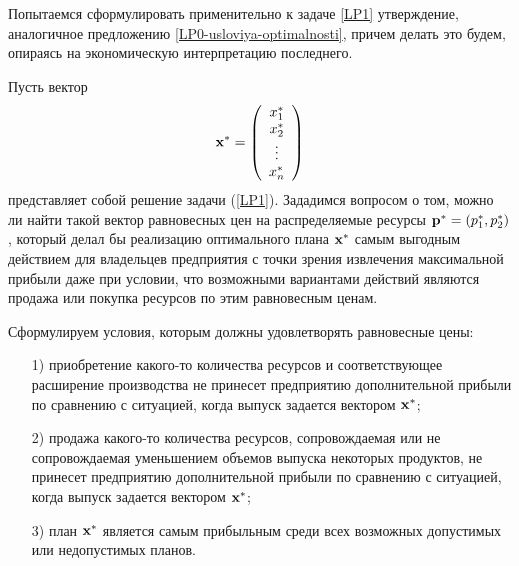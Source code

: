     Попытаемся сформулировать применительно к задаче \ref{LP1}
    утверждение, аналогичное предложению
    \ref{LP0-usloviya-optimalnosti}, причем делать это будем,
    опираясь на экономическую интерпретацию последнего.

    Пусть вектор
    \[\mathbf{x^{*}}=\left(
     \begin{array}{c}
        x_{1}^{*} \\
        x_{2}^{*} \\
        \vdots \\
        x_{n}^{*}  \\
      \end{array}
\right)\]
     представляет собой
    решение задачи (\ref{LP1}). Зададимся вопросом о том, можно ли найти
    такой вектор равновесных цен на распределяемые ресурсы
    $\mathbf{p^{*}}=(p_{1}^{*},p_{2}^{*})$,
    который делал бы реализацию оптимального плана $\mathbf{x^{*}}$
    самым выгодным действием для владельцев предприятия с точки
    зрения извлечения максимальной прибыли даже при условии, что
    возможными вариантами действий являются продажа или покупка
    ресурсов по этим равновесным ценам.

    Сформулируем условия, которым должны удовлетворять равновесные цены:
  \begin{itemize}

    \item [1)] приобретение какого-то количества ресурсов и
    соответствующее расширение производства не принесет предприятию дополнительной
    прибыли по сравнению с ситуацией, когда выпуск задается вектором $\mathbf{x^{*}}$;
    \item [2)] продажа какого-то количества ресурсов, сопровождаемая или
    не сопровождаемая уменьшением объемов выпуска некоторых
    продуктов,  не принесет предприятию дополнительной
    прибыли по сравнению с ситуацией, когда выпуск задается вектором $\mathbf{x^{*}}$;
    \item [3)] план $\mathbf{x^{*}}$ является самым прибыльным среди
    всех возможных допустимых или недопустимых планов.
  \end{itemize}

